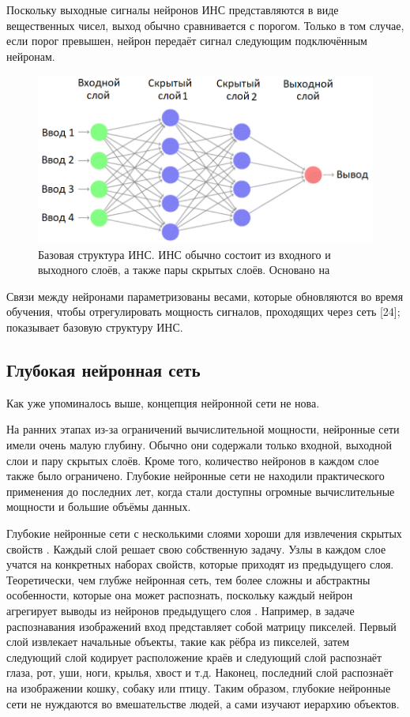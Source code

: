 Поскольку выходные сигналы нейронов ИНС представляются в виде вещественных чисел, выход обычно сравнивается с порогом. Только в том случае, если порог превышен, нейрон передаёт сигнал следующим подключённым нейронам.

\begin{figure}[ht!]
    \center
    \includegraphics [scale=0.60] {my_folder/images/ch1/ANN.png}
    \caption{Базовая структура ИНС. ИНС обычно состоит из входного и выходного слоёв, а также пары скрытых слоёв. Основано на \cite{Khajanchi2003ArtificialNN} \cite{mitchell1997machine}}
    \label{fig:ch1-ANN}
\end{figure}

Связи между нейронами параметризованы весами, которые обновляются во время обучения, чтобы отрегулировать мощность сигналов, проходящих через сеть [24];  показывает базовую структуру ИНС.

\subsection{Глубокая нейронная сеть}

Как уже упоминалось выше, концепция нейронной сети не нова.

На ранних этапах из-за ограничений вычислительной мощности, нейронные сети имели очень малую глубину. Обычно они содержали только входной, выходной слои и пару скрытых слоёв. Кроме того, количество нейронов в каждом слое также было ограничено. Глубокие нейронные сети не находили практического применения до последних лет, когда стали доступны огромные вычислительные мощности и большие объёмы данных.

Глубокие нейронные сети с несколькими слоями хороши для извлечения скрытых свойств \cite{7344858}. Каждый слой решает свою собственную задачу. Узлы в каждом слое учатся на конкретных наборах свойств, которые приходят из предыдущего слоя. Теоретически, чем глубже нейронная сеть, тем более сложны и абстрактны особенности, которые она может распознать, поскольку каждый нейрон агрегирует выводы из нейронов предыдущего слоя \cite{bengio2012representation}. Например, в задаче распознавания изображений вход представляет собой матрицу пикселей. Первый слой извлекает начальные объекты, такие как рёбра из пикселей, затем следующий слой кодирует расположение краёв и следующий слой распознаёт глаза, рот, уши, ноги, крылья, хвост и т.д. Наконец, последний слой распознаёт на изображении кошку, собаку или птицу. Таким образом, глубокие нейронные сети не нуждаются во вмешательстве людей, а сами изучают иерархию объектов.

